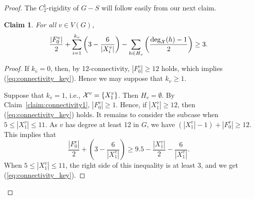 \documentclass{daj}
\newtheorem{claim}[thm]{Claim}\theoremstyle{plain}
\begin{document}
\begin{proof}
The $C_2^1$-rigidity of $G-S$ will  follow easily from our next claim.

\begin{claim}
\label{claim:connectivity2}
For all $v\in V(G)$,
\begin{equation}
\label{eq:connectivity_key}
\frac{|F_0^v|}{2}+\sum_{i=1}^{k_v}\left(3-\frac{6}{|X_i^v|}\right)-\sum_{h\in H_v}\left(\frac{{\rm deg}_{\cal X}(h)-1}{2}\right)\geq 3.
\end{equation}
\end{claim}
\begin{proof}
If $k_v=0$, then, by 12-connectivity, $|F_0^v|\geq 12$ holds, which implies (\ref{eq:connectivity_key}).
Hence we may suppose that $k_v\geq 1$.
%
%
%


Suppose that $k_v=1$, i.e., ${\cal X}^v=\{X_1^v\}$. Then $H_v=\emptyset$.
By Claim~\ref{claim:connectivity1}, $|F_0^v|\geq 1$.
Hence, if $|X_1^v|\geq 12$, then (\ref{eq:connectivity_key}) holds.
It remains to  consider the subcase when $5\leq |X_1^v|\leq 11$.
As $v$ has degree at least 12 in $G$, we have 
$(|X_1^v|-1)+|F_0^v|\geq 12$.
This implies that
\[
\frac{|F_0^v|}{2}+\left(3-\frac{6}{|X_1^v|}\right)
\geq 9.5-\frac{|X_1^v|}{2}-\frac{6}{|X_1^v|}.
\]
When $5\leq |X_1^v|\leq 11$, the right side of this inequality is at least $3$,
and we get (\ref{eq:connectivity_key}).



\end{proof}
\end{proof}
\end{document}
